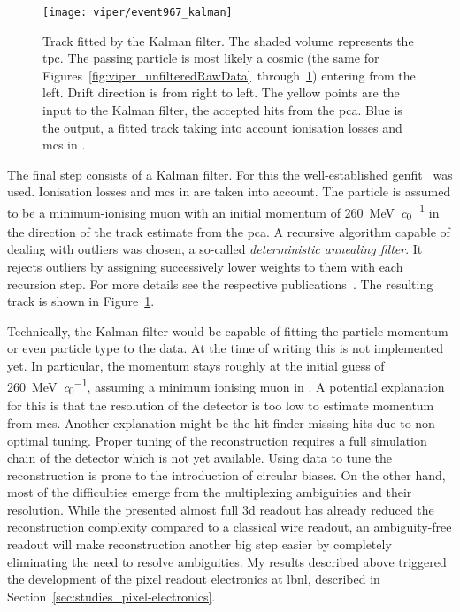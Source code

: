 \begin{figure}[tbp]
	\centering
	\texttt{[image: viper/event967\_kalman]}
	\caption[Kalman-fitted track of typical pixel demonstrator event]{%
		Track fitted by the Kalman filter.
		The shaded volume represents the \acrshort{tpc}.
		The passing particle is most likely a cosmic \Pgm (the same for Figures~\ref{fig:viper_unfilteredRawData}~through~\ref{fig:viper_kalman}) entering from the left.
		Drift direction is from right to left.
		The yellow points are the input to the Kalman filter, the accepted hits from the \acrshort{pca}.
		Blue is the output, a fitted track taking into account ionisation losses and \acrshort{mcs} in \lar{}.
	}
	\label{fig:viper_kalman}
\end{figure}

The final step consists of a Kalman filter.
For this the well-established \gls{genfit}~\cite{genfit1, genfit2} was used.
Ionisation losses and \gls{mcs} in \lar{} are taken into account.
The particle is assumed to be a minimum-ionising muon with an initial momentum of \SI{260}{\mega\electronvolt\per\clight} in the direction of the track estimate from the \gls{pca}.
A recursive algorithm capable of dealing with outliers was chosen, a so-called \emph{deterministic annealing filter}.
It rejects outliers by assigning successively lower weights to them with each recursion step.
For more details see the respective publications~\cite{genfit1, genfit2}.
The resulting track is shown in Figure~\ref{fig:viper_kalman}.

Technically, the Kalman filter would be capable of fitting the particle momentum or even particle type to the data.
At the time of writing this is not implemented yet.
In particular, the momentum stays roughly at the initial guess of \SI{260}{\mega\electronvolt\per\clight}, assuming a minimum ionising muon in \lar{}.
A potential explanation for this is that the resolution of the detector is too low to estimate momentum from \gls{mcs}.
Another explanation might be the hit finder missing hits due to non-optimal tuning.
Proper tuning of the reconstruction requires a full simulation chain of the detector which is not yet available.
Using data to tune the reconstruction is prone to the introduction of circular biases.
On the other hand, most of the difficulties emerge from the multiplexing ambiguities and their resolution.
While the presented almost full \gls{3d} readout has already reduced the reconstruction complexity compared to a classical wire readout, an ambiguity-free readout will make reconstruction another big step easier by completely eliminating the need to resolve ambiguities.
My results described above triggered the development of the \larpix{} pixel readout electronics at \gls{lbnl}, described in Section~\ref{sec:studies_pixel-electronics}.


